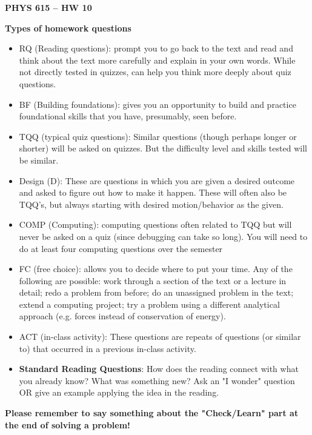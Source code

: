 \documentclass[12pt]{article}
\newcommand{\shortlist}{%
\parindent 0in%
\parskip   0in%
\itemsep   0in%
\topsep    0in%
\parsep    0in%
}
\newcommand{\Title}{PHYS 615 -- HW 10}
\begin{document}
\begin{center}
      {\Large\bfseries\Title}

\end{center}
\bigskip
\bigskip

\textbf{Types of homework questions}
\begin{itemize}\shortlist
      \item	RQ (Reading questions):  prompt you to go back to the text and read and think about the text more carefully and explain in your own words. While not directly tested in quizzes, can help you think more deeply about quiz questions.
      \item	BF (Building foundations):  gives you an opportunity to build and practice foundational skills that you have, presumably, seen before.
      \item	TQQ (typical quiz questions):   Similar questions (though perhaps longer or shorter) will be asked on quizzes.  But the difficulty level and skills tested will be similar.
      \item Design (D):  These are questions in which you are given a desired outcome and asked to figure out how to make it happen.  These will often also be TQQ’s, but always starting with desired motion/behavior as the given.
      \item	COMP (Computing): computing questions often related to TQQ but will never be asked on a quiz (since debugging can take so long).  You will need to do at least four computing questions over the semester
      \item	FC (free choice): allows you to decide where to put your time.  Any of the following are possible:  work through a section of the text or a lecture in detail; redo a problem from before; do an unassigned problem in the text; extend a computing project; try a problem using a different analytical approach (e.g. forces instead of conservation of energy).
      \item ACT (in-class activity): These questions are repeats of questions (or similar to) that occurred in a previous in-class activity.
      \item \textbf{Standard Reading Questions}: How does the reading connect with what you already know? What was something new?  Ask an "I wonder" question OR give an example applying the idea in the reading.
\end{itemize}

\textbf{Please remember to say something about the "Check/Learn" part at the end of solving a problem!}
\end{document}
